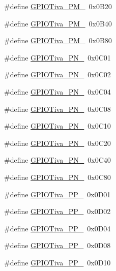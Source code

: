 \begin{DoxyCompactItemize}
\#define \hyperlink{_g_p_i_o_tiva_8h_aabbd043246f43310d70fd36c48b36b0e}{G\+P\+I\+O\+Tiva\+\_\+\+P\+M\+\_}~0x0\+B20
\item 
\#define \hyperlink{_g_p_i_o_tiva_8h_a5fc0aceeb5e20a0af618e5faf1207948}{G\+P\+I\+O\+Tiva\+\_\+\+P\+M\+\_}~0x0\+B40
\item 
\#define \hyperlink{_g_p_i_o_tiva_8h_af4dc97723866e433b0bc5c0e85afd69c}{G\+P\+I\+O\+Tiva\+\_\+\+P\+M\+\_}~0x0\+B80
\item 
\#define \hyperlink{_g_p_i_o_tiva_8h_ad0ae70e188d79edb8cce879686cdc570}{G\+P\+I\+O\+Tiva\+\_\+\+P\+N\+\_}~0x0\+C01
\item 
\#define \hyperlink{_g_p_i_o_tiva_8h_a49d2168036c242396f44766f419db540}{G\+P\+I\+O\+Tiva\+\_\+\+P\+N\+\_}~0x0\+C02
\item 
\#define \hyperlink{_g_p_i_o_tiva_8h_a9bbb01673290e7d2634d2f9a791953c7}{G\+P\+I\+O\+Tiva\+\_\+\+P\+N\+\_}~0x0\+C04
\item 
\#define \hyperlink{_g_p_i_o_tiva_8h_a2492e911fd9654b184accebdc526e718}{G\+P\+I\+O\+Tiva\+\_\+\+P\+N\+\_}~0x0\+C08
\item 
\#define \hyperlink{_g_p_i_o_tiva_8h_ab3a160736f749ac08cb24dd4280be33b}{G\+P\+I\+O\+Tiva\+\_\+\+P\+N\+\_}~0x0\+C10
\item 
\#define \hyperlink{_g_p_i_o_tiva_8h_a08a29f6a038b8ffdff0d441493458ef1}{G\+P\+I\+O\+Tiva\+\_\+\+P\+N\+\_}~0x0\+C20
\item 
\#define \hyperlink{_g_p_i_o_tiva_8h_a5f93f5b657d9234b02d432ef3996bf2f}{G\+P\+I\+O\+Tiva\+\_\+\+P\+N\+\_}~0x0\+C40
\item 
\#define \hyperlink{_g_p_i_o_tiva_8h_a5b019b10b5f3a9d23cc328ccc299c600}{G\+P\+I\+O\+Tiva\+\_\+\+P\+N\+\_}~0x0\+C80
\item 
\#define \hyperlink{_g_p_i_o_tiva_8h_a9369ab8a1f996fad9a2ea9ec3ee6251b}{G\+P\+I\+O\+Tiva\+\_\+\+P\+P\+\_}~0x0\+D01
\item 
\#define \hyperlink{_g_p_i_o_tiva_8h_a980f91ee3e9d25671114f8c3945f5268}{G\+P\+I\+O\+Tiva\+\_\+\+P\+P\+\_}~0x0\+D02
\item 
\#define \hyperlink{_g_p_i_o_tiva_8h_ad3a30a84d0d57a7f68a428b6492a3fac}{G\+P\+I\+O\+Tiva\+\_\+\+P\+P\+\_}~0x0\+D04
\item 
\#define \hyperlink{_g_p_i_o_tiva_8h_a116d4e6e9c245cc1b348043cc3c09b36}{G\+P\+I\+O\+Tiva\+\_\+\+P\+P\+\_}~0x0\+D08
\item 
\#define \hyperlink{_g_p_i_o_tiva_8h_a8e4120d697f6b9f591f1ee5585d86f69}{G\+P\+I\+O\+Tiva\+\_\+\+P\+P\+\_}~0x0\+D10
\item 

\end{DoxyCompactItemize}

